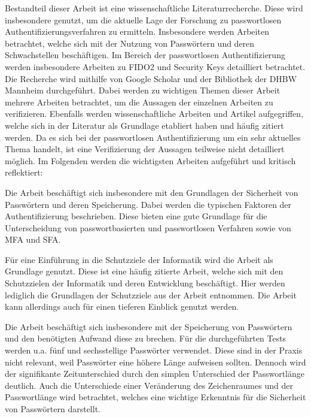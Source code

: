 Bestandteil dieser Arbeit ist eine wissenschaftliche Literaturrecherche. Diese wird insbesondere genutzt, um die aktuelle Lage der Forschung zu passwortlosen Authentifizierungsverfahren zu ermitteln. Insbesondere werden Arbeiten betrachtet, welche sich mit der Nutzung von Passwörtern und deren Schwachstellen beschäftigen. Im Bereich der passwortlosen Authentifizierung werden insbesondere Arbeiten zu \ac{FIDO}2 und Security Keys detailliert betrachtet. Die Recherche wird mithilfe von Google Scholar und der Bibliothek der DHBW Mannheim durchgeführt. Dabei werden zu wichtigen Themen dieser Arbeit mehrere Arbeiten betrachtet, um die Aussagen der einzelnen Arbeiten zu verifizieren. Ebenfalls werden wissenschaftliche Arbeiten und Artikel aufgegriffen, welche sich in der Literatur als Grundlage etabliert haben und häufig zitiert werden. Da es sich bei der passwortlosen Authentifizierung um ein sehr aktuelles Thema handelt, ist eine Verifizierung der Aussagen teilweise nicht detailliert möglich. Im Folgenden werden die wichtigsten Arbeiten aufgeführt und kritisch reflektiert:

Die Arbeit \cite{boonkrong2012security} beschäftigt sich insbesondere mit den Grundlagen der Sicherheit von Passwörtern und deren Speicherung. Dabei werden die typischen Faktoren der Authentifizierung beschrieben. Diese bieten eine gute Grundlage für die Unterscheidung von passwortbasierten und passwortlosen Verfahren sowie von \ac{MFA} und \ac{SFA}. 

Für eine Einführung in die Schutzziele der Informatik wird die Arbeit \cite{samonas2014cia} als Grundlage genutzt. Diese ist eine häufig zitierte Arbeit, welche sich mit den Schutzzielen der Informatik und deren Entwicklung beschäftigt. Hier werden lediglich die Grundlagen der Schutzziele aus der Arbeit entnommen. Die Arbeit kann allerdings auch für einen tieferen Einblick genutzt werden.

Die Arbeit \cite{chanda2016password} beschäftigt sich insbesondere mit der Speicherung von Passwörtern und den benötigten Aufwand diese zu brechen. Für die durchgeführten Tests werden u.a. fünf und sechsstellige Passwörter verwendet. Diese sind in der Praxis nicht relevant, weil Passwörter eine höhere Länge aufweisen sollten. Dennoch wird der signifikante Zeitunterschied durch den simplen Unterschied der Passwortlänge deutlich. Auch die Unterschiede einer Veränderung des Zeichenraumes und der Passwortlänge wird betrachtet, welches eine wichtige Erkenntnis für die Sicherheit von Passwörtern darstellt.

